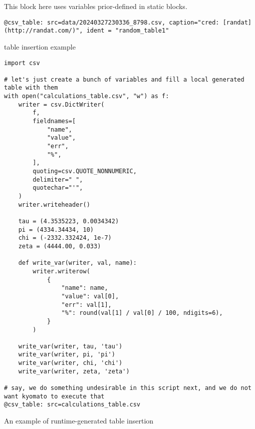\documentclass[a4paper]{article}
\begin{document}
This block here uses variables prior-defined in static blocks. \\

\begin{verbatim}
@csv_table: src=data/20240327230336_8798.csv, caption="cred: [randat](http://randat.com/)", ident = "random_table1"
\end{verbatim}

table insertion example \\

\begin{verbatim}
import csv

# let's just create a bunch of variables and fill a local generated table with them
with open("calculations_table.csv", "w") as f:
    writer = csv.DictWriter(
        f,
        fieldnames=[
            "name",
            "value",
            "err",
            "%",
        ],
        quoting=csv.QUOTE_NONNUMERIC,
        delimiter=" ",
        quotechar="'",
    )
    writer.writeheader()

    tau = (4.3535223, 0.0034342)
    pi = (4334.34434, 10)
    chi = (-2332.332424, 1e-7)
    zeta = (4444.00, 0.033)

    def write_var(writer, val, name):
        writer.writerow(
            {
                "name": name,
                "value": val[0],
                "err": val[1],
                "%": round(val[1] / val[0] / 100, ndigits=6),
            }
        )

    write_var(writer, tau, 'tau')
    write_var(writer, pi, 'pi')
    write_var(writer, chi, 'chi')
    write_var(writer, zeta, 'zeta')

# say, we do something undesirable in this script next, and we do not want kyomato to execute that
@csv_table: src=calculations_table.csv
\end{verbatim}

An example of runtime-generated table insertion \\
\end{document}
